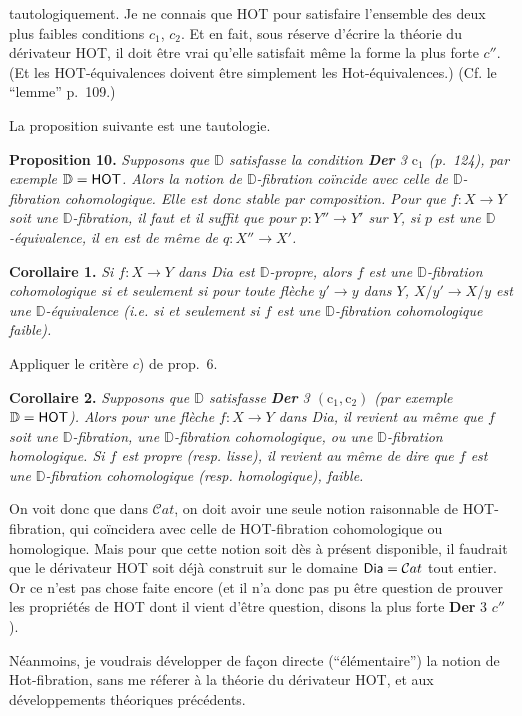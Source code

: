 \documentclass[11pt]{article}
\newcommand{\printedpage}[1]{\marginpar{\footnotesize p.~#1}}
\newcommand{\msp}[1]{\marginpar{\footnotesize [#1]}}
\newcommand{\HOT}{\textsf{HOT}}
\newcommand{\Hot}{\textsf{Hot}}
\newcommand{\Dia}{\textsf{Dia}}
\newcommand{\Cat}{\mathcal{C}at}
\newcommand{\D}{\mathbb{D}}
\begin{document}
\printedpage{74}
tautologiquement. Je ne connais que \HOT{} pour satisfaire l'ensemble des deux plus faibles conditions $c_1$, $c_2$. Et en fait, sous réserve d'écrire la théorie du dérivateur \HOT, il doit être vrai qu'elle satisfait même la forme la plus forte $c''$. (Et les \HOT-équivalences doivent être simplement les \Hot-équivalences.) (Cf. le “lemme” p.~109.)

La proposition suivante est une tautologie.

\noindent\textbf{Proposition 10.} \textit{Supposons que $\D$ satisfasse la condition \textup{\textbf{Der} 3 $\mathrm{c}_1$ (p.~124),} par exemple $\D = \text{\HOT}$. Alors la notion de $\D$-fibration coïncide avec celle de $\D$-fibration cohomologique. Elle est donc stable par composition. Pour que $f : X \to Y$ soit une $\D$-fibration, il faut et il suffit que pour $p : Y'' \to Y'$ sur $Y$, si $p$ est une $\D$-équivalence, il en est de même de $q : X'' \to X'$.}

\noindent\textbf{Corollaire 1.} \textit{Si $f : X \to Y$ dans \textup{\Dia} est $\D$-propre, alors $f$ est une $\D$-fibration cohomologique si et seulement si pour toute flèche $y' \to y$ dans $Y$, $X/y' \to X/y$ est une $\D$-équivalence \textup{(i.e.} si et seulement si $f$ est une $\D$-fibration cohomologique faible\textup{).}}

Appliquer le critère $c$) de prop.~6.

\msp{page 126}

\noindent\textbf{Corollaire 2.} \textit{Supposons que $\D$ satisfasse \textup{\textbf{Der} 3 $(\mathrm{c}_1, \mathrm{c}_2)$ (par exemple $\D = \text{\HOT}$).} Alors pour une flèche $f : X \to Y$ dans \textup{\Dia}, il revient au même que $f$ soit une $\D$-fibration, une $\D$-fibration cohomologique, ou une $\D$-fibration homologique. Si $f$ est propre \textup{(resp.} lisse\textup{),} il revient au même de dire que $f$ est une $\D$-fibration cohomologique \textup{(resp.} homologique\textup{),} faible.}

On voit donc que dans $\Cat$, on doit avoir une seule notion raisonnable de \HOT-fibration, qui coïncidera avec celle de \HOT-fibration cohomologique ou homologique. Mais pour que cette notion soit dès à présent disponible, il faudrait que le dérivateur \HOT{} soit déjà construit sur le domaine $\text{\Dia} = \Cat$ tout entier. Or ce n'est pas chose faite encore (et il n'a donc pas pu être question de prouver les propriétés de \HOT{} dont il vient d'être question, disons la plus forte \textbf{Der} 3 $c''$).

Néanmoins, je voudrais développer de façon directe (“élémentaire”) la notion de \Hot-fibration, sans me réferer à la théorie du dérivateur \HOT, et aux développements théoriques précédents. %
\end{document}
